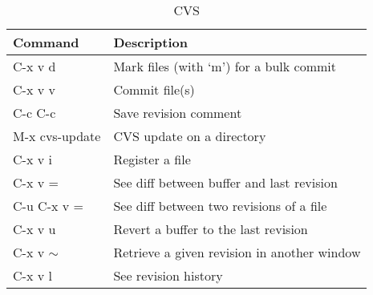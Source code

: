 \documentclass[11pt, a4paper]{article}
\begin{document}
\begin{table}[!ht]
  \caption{CVS}
  \begin{center}
    \begin{tabular}{l l}
      \hline
      Command        &  Description \\
      \hline
      C-x v d        &  Mark files (with `m') for a bulk commit \\
      C-x v v        &  Commit file(s) \\
      C-c C-c        &  Save revision comment \\
      M-x cvs-update &  CVS update on a directory \\
      C-x v i        &  Register a file \\
      C-x v =        &  See diff between buffer and last revision \\
      C-u C-x v =    &  See diff between two revisions of a file \\
      C-x v u        &  Revert a buffer to the last revision \\
      C-x v $\sim$   &  Retrieve a given revision in another window \\
      C-x v l        &  See revision history \\
      \hline
    \end{tabular}
  \end{center}
\end{table}
\end{document}
